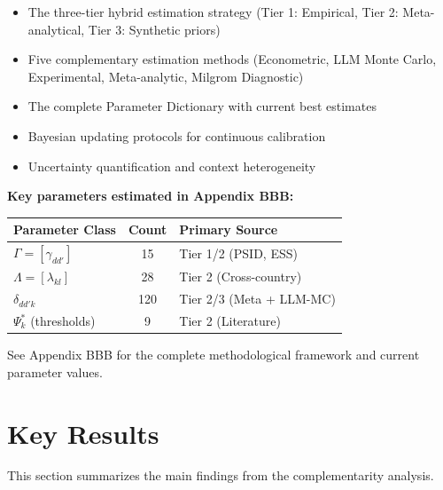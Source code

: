 \begin{itemize}
    \item The three-tier hybrid estimation strategy (Tier 1: Empirical, Tier 2: 
    Meta-analytical, Tier 3: Synthetic priors)
    \item Five complementary estimation methods (Econometric, LLM Monte Carlo, 
    Experimental, Meta-analytic, Milgrom Diagnostic)
    \item The complete Parameter Dictionary with current best estimates
    \item Bayesian updating protocols for continuous calibration
    \item Uncertainty quantification and context heterogeneity
\end{itemize}

\textbf{Key parameters estimated in Appendix BBB:}
\begin{center}
\begin{tabular}{lcl}
\toprule
\textbf{Parameter Class} & \textbf{Count} & \textbf{Primary Source} \\
\midrule
$\Gamma = [\gamma_{dd'}]$ & 15 & Tier 1/2 (PSID, ESS) \\
$\Lambda = [\lambda_{kl}]$ & 28 & Tier 2 (Cross-country) \\
$\delta_{dd'k}$ & 120 & Tier 2/3 (Meta + LLM-MC) \\
$\Psi^*_k$ (thresholds) & 9 & Tier 2 (Literature) \\
\bottomrule
\end{tabular}
\end{center}

See Appendix BBB for the complete methodological framework and current parameter 
values.





\section{Key Results}
\label{sec:B-key-results}

This section summarizes the main findings from the complementarity analysis.

